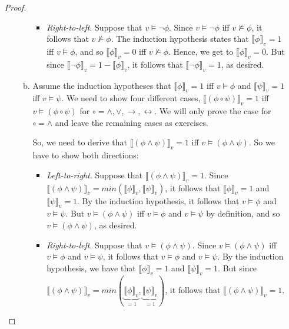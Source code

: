 \begin{enumerate}[\thesection.1]
\begin{proof}
\begin{enumerate}[(i)]
\begin{enumerate}[(a)]
\begin{itemize}
						\item \emph{Right-to-left}. Suppose that $v\vDash\neg \phi$. Since $v\vDash\neg \phi$ iff $v\nvDash\phi$, it follows that  $v\nvDash\phi$. The induction hypothesis states that $\llbracket\phi\rrbracket_v=1$ iff $v\vDash\phi$, and so $\llbracket\phi\rrbracket_v=0$ iff $v\nvDash\phi$. Hence, we get to $\llbracket\phi\rrbracket_v=0$. But since $\llbracket\neg \phi\rrbracket_v=1-\llbracket \phi\rrbracket_v$, it follows that $\llbracket\neg \phi\rrbracket_v=1$, as desired.
				
					\end{itemize}
					
				\item Assume the induction hypotheses that $\llbracket\phi\rrbracket_v=1$ iff $v\vDash \phi$ and $\llbracket\psi\rrbracket_v=1$ iff $v\vDash \psi$. We need to show four different cases, $\llbracket (\phi\circ\psi)\rrbracket_v=1$ iff $v\vDash(\phi\circ\psi)$ for $\circ=\land,\lor,\to,\leftrightarrow$. We will only prove the case for $\circ=\land$ and leave the remaining cases as exercises.
				
				So, we need to derive that $\llbracket (\phi\land\psi)\rrbracket_v=1$ iff $v\vDash(\phi\land\psi)$. So we have to show both directions:
					\begin{itemize}
	
						\item \emph{Left-to-right}. 	Suppose that $\llbracket (\phi\land\psi)\rrbracket_v=1$. Since $\llbracket (\phi\land\psi)\rrbracket_v=min(\llbracket \phi\rrbracket_v,\llbracket \psi\rrbracket_v)$, it follows that $\llbracket \phi\rrbracket_v=1$ and $\llbracket \psi\rrbracket_v=1$. By the induction hypothesis, it follows that $v\vDash \phi$ and $v\vDash \psi$. But  $v\vDash(\phi\land\psi)$ iff $v\vDash\phi$ and $v\vDash\psi$ by definition, and so $v\vDash(\phi\land\psi)$, as desired.

									
						\item \emph{Right-to-left}. Suppose that $v\vDash(\phi\land\psi)$. Since $v\vDash(\phi\land\psi)$ iff $v\vDash\phi$ and $v\vDash\psi$, it follows that $v\vDash\phi$ and $v\vDash\psi$. By the induction hypothesis, we have that $\llbracket \phi\rrbracket_v=1$ and $\llbracket \psi\rrbracket_v=1$. But since $\llbracket (\phi\land\psi)\rrbracket_v=min(\underbrace{\llbracket \phi\rrbracket_v}_{=1},\underbrace{\llbracket \psi\rrbracket_v}_{=1})$, it follows that $\llbracket (\phi\land\psi)\rrbracket_v=1$.
				
					\end{itemize}
					
				\end{enumerate}
			\end{enumerate}
		\end{proof}				
		
	
				
	\end{enumerate}
	
